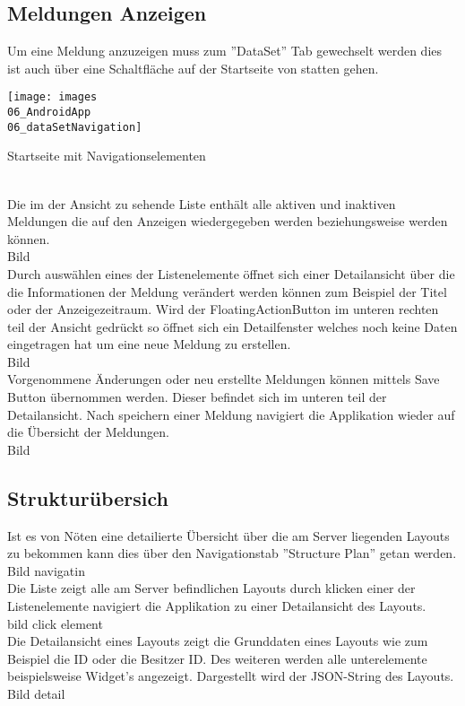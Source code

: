 \subsection{Meldungen Anzeigen}
Um eine Meldung anzuzeigen muss zum ''DataSet'' Tab gewechselt werden dies ist auch über eine Schaltfläche auf der Startseite von statten gehen.
\begin{navDataSet}
\centering
\texttt{[image: images\\06\_AndroidApp\\06\_dataSetNavigation]}
\caption{Startseite mit Navigationselementen}
\label{fig:mediaNav}
\end{navDataSet}
\\
Die im der Ansicht zu sehende Liste enthält alle aktiven und  inaktiven Meldungen die auf den Anzeigen wiedergegeben werden beziehungsweise werden können. 
\\
Bild 
\\
Durch auswählen eines der Listenelemente öffnet sich einer Detailansicht über die die Informationen der Meldung verändert werden können zum Beispiel der Titel oder der Anzeigezeitraum. Wird der FloatingActionButton im unteren rechten teil der Ansicht gedrückt so öffnet sich ein Detailfenster welches noch keine Daten eingetragen hat um eine neue Meldung zu erstellen.
\\
Bild
\\
Vorgenommene Änderungen oder neu erstellte Meldungen können mittels Save Button übernommen werden. Dieser befindet sich im unteren teil der Detailansicht. Nach speichern einer Meldung navigiert die Applikation wieder auf die Übersicht der Meldungen.
\\
Bild
\\
\subsection{Strukturübersich}
Ist es von Nöten eine detailierte Übersicht über die am Server liegenden Layouts zu bekommen kann dies über den Navigationstab ''Structure Plan'' getan werden. 
\\
Bild navigatin
\\
Die Liste zeigt alle am Server befindlichen Layouts durch klicken einer der Listenelemente navigiert die Applikation zu einer Detailansicht des Layouts.
\\
bild click element
\\
Die Detailansicht eines Layouts zeigt die Grunddaten eines Layouts wie zum Beispiel die ID oder die Besitzer ID. Des weiteren werden alle unterelemente beispielsweise Widget's angezeigt. Dargestellt wird der JSON-String des Layouts.
\\
Bild detail
\\
